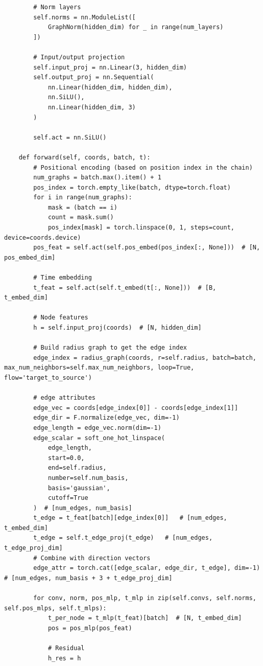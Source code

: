 \documentclass[a4paper,12pt]{article}
\begin{document}
\begin{verbatim}
        # Norm layers
        self.norms = nn.ModuleList([
            GraphNorm(hidden_dim) for _ in range(num_layers)
        ])

        # Input/output projection
        self.input_proj = nn.Linear(3, hidden_dim)
        self.output_proj = nn.Sequential(
            nn.Linear(hidden_dim, hidden_dim),
            nn.SiLU(),
            nn.Linear(hidden_dim, 3)
        )

        self.act = nn.SiLU()

    def forward(self, coords, batch, t):
        # Positional encoding (based on position index in the chain)
        num_graphs = batch.max().item() + 1
        pos_index = torch.empty_like(batch, dtype=torch.float)
        for i in range(num_graphs):
            mask = (batch == i)
            count = mask.sum()
            pos_index[mask] = torch.linspace(0, 1, steps=count, device=coords.device)
        pos_feat = self.act(self.pos_embed(pos_index[:, None]))  # [N, pos_embed_dim]

        # Time embedding
        t_feat = self.act(self.t_embed(t[:, None]))  # [B, t_embed_dim]

        # Node features
        h = self.input_proj(coords)  # [N, hidden_dim]

        # Build radius graph to get the edge index
        edge_index = radius_graph(coords, r=self.radius, batch=batch, max_num_neighbors=self.max_num_neighbors, loop=True, flow='target_to_source')

        # edge attributes
        edge_vec = coords[edge_index[0]] - coords[edge_index[1]]
        edge_dir = F.normalize(edge_vec, dim=-1)
        edge_length = edge_vec.norm(dim=-1)
        edge_scalar = soft_one_hot_linspace(
            edge_length,
            start=0.0,
            end=self.radius,
            number=self.num_basis,
            basis='gaussian',
            cutoff=True
        )  # [num_edges, num_basis]
        t_edge = t_feat[batch][edge_index[0]]   # [num_edges, t_embed_dim]
        t_edge = self.t_edge_proj(t_edge)   # [num_edges, t_edge_proj_dim]
        # Combine with direction vectors
        edge_attr = torch.cat([edge_scalar, edge_dir, t_edge], dim=-1)  # [num_edges, num_basis + 3 + t_edge_proj_dim]

        for conv, norm, pos_mlp, t_mlp in zip(self.convs, self.norms, self.pos_mlps, self.t_mlps):
            t_per_node = t_mlp(t_feat)[batch]  # [N, t_embed_dim]
            pos = pos_mlp(pos_feat)

            # Residual
            h_res = h


\end{verbatim}
\end{document}
